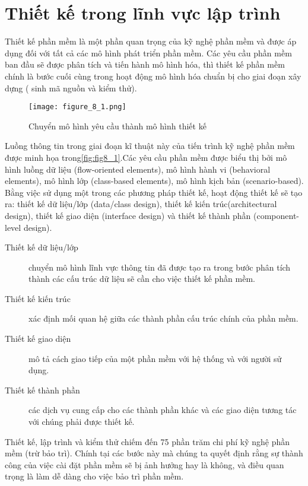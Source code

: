 \documentclass[./../SoftwareEngineering.tex]{subfiles}
\begin{document}
	\section{Thiết kế trong lĩnh vực lập trình}
	Thiết kế phần mềm  là một phần quan trọng của kỹ nghệ phần mềm và được áp dụng đối với tất cả các mô hình phát triển phần mềm. Các yêu cầu phần mềm ban đầu sẽ được phân tích và tiến hành mô hình hóa, thì thiết kế phần mềm chính là bước cuối cùng trong hoạt động mô hình hóa chuẩn bị cho giai đoạn xây dựng ( sinh mã nguồn và kiểm thử).
	

	
	\begin{figure}[!htb]
		\centering
		\texttt{[image: figure\_8\_1.png]}
		\caption{Chuyển mô hình yêu cầu thành mô hình thiết kế}
		\label{fig:fig8_1}
	\end{figure}
	
	Luồng thông tin trong giai đoạn kĩ thuật này của tiến trình kỹ nghệ phần mềm được minh họa trong\autoref{fig:fig8_1}.Các yêu cầu phần mềm được biểu thị bởi mô hình luồng dữ liệu (flow-oriented elements), mô hình hành vi (behavioral elements), mô hình lớp (class-based elements), mô hình kịch bản (scenario-based). Bằng việc sử dụng một trong các phương pháp thiết kế, hoạt động thiết kế sẽ tạo ra:  thiết kế dữ liệu/lớp (data/class design), thiết kế kiến trúc(architectural design), thiết kế giao diện (interface design) và thiết kế thành phần (component-level design).
	
	

	\begin{description}
		\item[Thiết kế dữ liệu/lớp] chuyển mô hình lĩnh vực thông tin đã được tạo ra trong bước phân tích thành các cấu trúc dữ liệu sẽ cần cho việc thiết kế phần mềm. 
		\item[Thiết kế kiến trúc] xác định mối quan hệ giữa các thành phần cấu trúc chính của phần mềm.
		\item[Thiết kế giao diện] mô tả cách giao tiếp của một phần mềm với hệ thống và với người sử dụng. 
		\item[Thiết kế thành phần] các dịch vụ cung cấp cho các thành phần khác và các giao diện tương tác với chúng phải được thiết kế. 
	\end{description}
	
	
	Thiết kế, lập trình và kiểm thử chiếm đến 75 phần trăm chi phí kỹ nghệ phần mềm (trừ bảo trì). Chính tại các bước này mà chúng ta quyết định rằng sự thành công của việc cài đặt phần mềm sẽ bị ảnh hưởng hay là không, và điều quan trọng là làm dễ dàng cho việc bảo trì phần mềm. 
	
\end{document}
